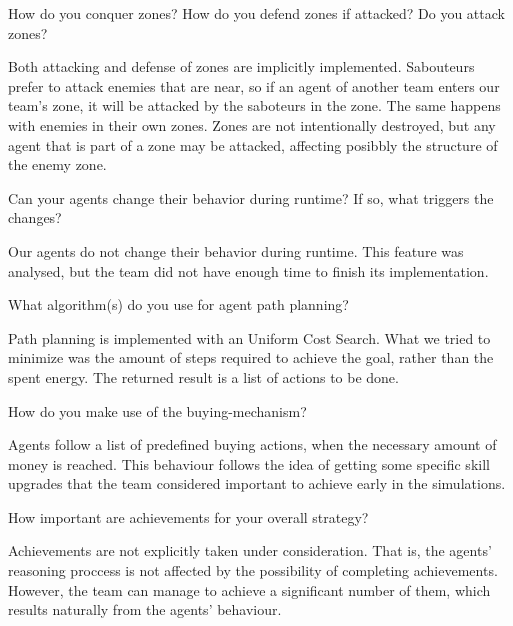 \begin{question}
How do you conquer zones? How do you defend zones if attacked? Do you attack
zones?  
\end{question}

Both attacking and defense of zones are implicitly implemented.  Sabouteurs
prefer to attack enemies that are near, so if an agent of another team enters
our team's zone, it will be attacked by the saboteurs in the zone.  The same
happens with enemies in their own zones. Zones are not intentionally destroyed,
but any agent that is part of a zone may be attacked, affecting posibbly the
structure of the enemy zone.

\begin{question}
Can your agents change their behavior during runtime? If so, what triggers
the changes?  
\end{question}

Our agents do not change their behavior during runtime. This feature was
analysed, but the team did not have enough time to finish its implementation.

\begin{question}
What algorithm(s) do you use for agent path planning?  
\end{question}

Path planning is implemented with an Uniform Cost Search. What we tried to
minimize was the amount of steps required to achieve the goal, rather than the
spent energy. The returned result is a list of actions to be done.

\begin{question}
How do you make use of the buying-mechanism?  
\end{question}

Agents follow a list of predefined buying actions, when the necessary amount of
money is reached. This behaviour follows the idea of getting some specific skill
upgrades that the team considered important to achieve early in the simulations.

\begin{question}
How important are achievements for your overall strategy?  
\end{question}

Achievements are not explicitly taken under consideration. That is, the agents'
reasoning proccess is not affected by the possibility of completing
achievements.    However, the team can manage to achieve a significant number of
them, which results naturally from the agents' behaviour. 

